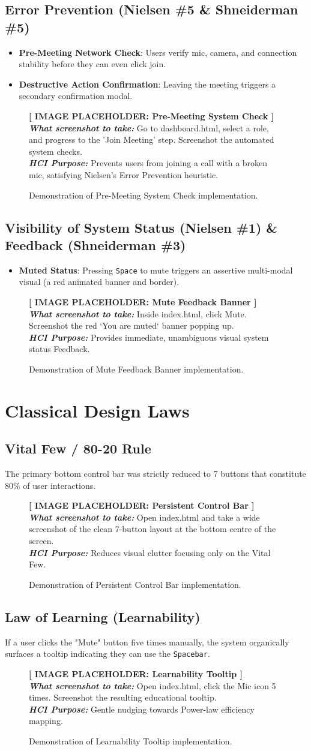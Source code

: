 \documentclass[12pt,a4paper]{article}
\newcommand{\imageplaceholder}[3]{
    \begin{figure}[H]
        \centering
        \begin{tcolorbox}[colback=placeholderbg,colframe=placeholderborder,arc=4mm,height=7.5cm,valign=center,halign=center]
            {\Large\textbf{\textcolor{hciblue}{[ IMAGE PLACEHOLDER: #1 ]}}}\\[0.5cm]
            \textit{\textbf{What screenshot to take:}} #2\\[0.3cm]
            \textit{\textbf{HCI Purpose:}} #3
        \end{tcolorbox}
        \caption{Demonstration of #1 implementation.}
    \end{figure}
}
\begin{document}
\subsection{Error Prevention (Nielsen \#5 \& Shneiderman \#5)}
\begin{itemize}
    \item \textbf{Pre-Meeting Network Check}: Users verify mic, camera, and connection stability before they can even click join.
    \item \textbf{Destructive Action Confirmation}: Leaving the meeting triggers a secondary confirmation modal.
\end{itemize}
\imageplaceholder{Pre-Meeting System Check}{Go to dashboard.html, select a role, and progress to the 'Join Meeting' step. Screenshot the automated system checks.}{Prevents users from joining a call with a broken mic, satisfying Nielsen's Error Prevention heuristic.}

\subsection{Visibility of System Status (Nielsen \#1) \& Feedback (Shneiderman \#3)}
\begin{itemize}
    \item \textbf{Muted Status}: Pressing \texttt{Space} to mute triggers an assertive multi-modal visual (a red animated banner and border).
\end{itemize}
\imageplaceholder{Mute Feedback Banner}{Inside index.html, click Mute. Screenshot the red `You are muted` banner popping up.}{Provides immediate, unambiguous visual system status Feedback.}

\section{Classical Design Laws}

\subsection{Vital Few / 80-20 Rule}
The primary bottom control bar was strictly reduced to 7 buttons that constitute 80\% of user interactions.
\imageplaceholder{Persistent Control Bar}{Open index.html and take a wide screenshot of the clean 7-button layout at the bottom centre of the screen.}{Reduces visual clutter focusing only on the Vital Few.}

\subsection{Law of Learning (Learnability)}
If a user clicks the "Mute" button five times manually, the system organically surfaces a tooltip indicating they can use the \texttt{Spacebar}.
\imageplaceholder{Learnability Tooltip}{Open index.html, click the Mic icon 5 times. Screenshot the resulting educational tooltip.}{Gentle nudging towards Power-law efficiency mapping.}
\end{document}
